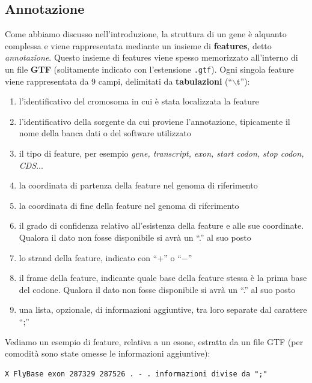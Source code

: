 \documentclass[a4paper,12pt, oneside]{book}
\begin{document}
\subsection{Annotazione}
Come abbiamo discusso nell'introduzione, la struttura di un gene è alquanto
complessa e viene rappresentata mediante un insieme di \textbf{features}, detto
\textit{annotazione}. Questo 
insieme di features viene spesso memorizzato all'interno di un file
\textbf{GTF} \cite{gtf} (solitamente indicato con l'estensione
\texttt{.gtf}). Ogni singola feature viene rappresentata da 9 campi, delimitati
da \textbf{tabulazioni} (``$\backslash$t''): 
\begin{enumerate}
  \item l'identificativo del cromosoma in cui è stata localizzata la feature
  \item l'identificativo della sorgente da cui proviene l'annotazione,
  tipicamente il nome della banca dati o del software utilizzato 
  \item il tipo di feature, per esempio \textit{gene, transcript, exon, start
    codon, stop codon, CDS}$\ldots$
  \item la coordinata di partenza della feature nel genoma di riferimento
  \item la coordinata di fine della feature nel genoma di riferimento
  \item il grado di confidenza relativo all'esistenza della feature e alle sue
  coordinate. Qualora il dato non fosse disponibile si avrà un ``.'' al suo
  posto 
  \item lo strand della feature, indicato con ``+'' o ``$-$''
  \item il frame della feature, indicante quale base della feature stessa è la
  prima base del codone. Qualora il dato non fosse disponibile si avrà un ``.''
  al suo posto
  \item una lista, opzionale, di informazioni aggiuntive, tra loro separate dal
  carattere ``;''
\end{enumerate}
\begin{esempio}
  Vediamo un esempio di feature, relativa a un esone, estratta da un file GTF
  (per comodità sono state omesse le informazioni aggiuntive):
\begin{verbatim}
X FlyBase exon 287329 287526 . - . informazioni divise da ";"	

\end{verbatim}
\end{esempio}
\end{document}
